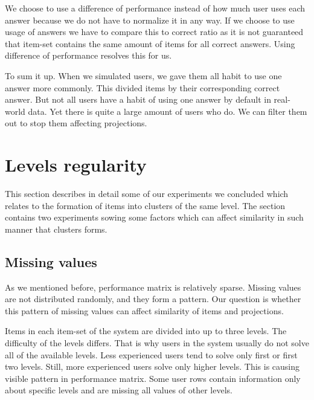\documentclass[
  digital, %
  table,   %
  nolof,     %
  nolot,     %
  nocover,
  color,
  final, %
]{fithesis3}
\begin{document}
We choose to use a difference of performance instead of how much user uses each answer because we do not have to normalize it in any way. If we choose to use usage of answers we have to compare this to correct ratio as it is not guaranteed that item-set contains the same amount of items for all correct answers. Using difference of performance resolves this for us.


To sum it up. When we simulated users, we gave them all habit to use one answer more commonly. This divided items by their corresponding correct answer. But not all users have a habit of using one answer by default in real-world data. Yet there is quite a large amount of users who do. We can filter them out to stop them affecting projections.


\section{Levels regularity}\label{evaulation-levels-regularity}

This section describes in detail some of our experiments we concluded which relates to the formation of items into clusters of the same level. The section contains two experiments sowing some factors which can affect similarity in such manner that clusters forms.


\subsection{Missing values}\label{missing-values}


As we mentioned before, performance matrix is relatively sparse. Missing values are not distributed randomly, and they form a pattern. Our question is whether this pattern of missing values can affect similarity of items and projections.


Items in each item-set of the system are divided into up to three levels. The difficulty of the levels differs. That is why users in the system usually do not solve all of the available levels. Less experienced users tend to solve only first or first two levels. Still, more experienced users solve only higher levels. This is causing visible pattern in performance matrix. Some user rows contain information only about specific levels and are missing all values of other levels.
\end{document}
